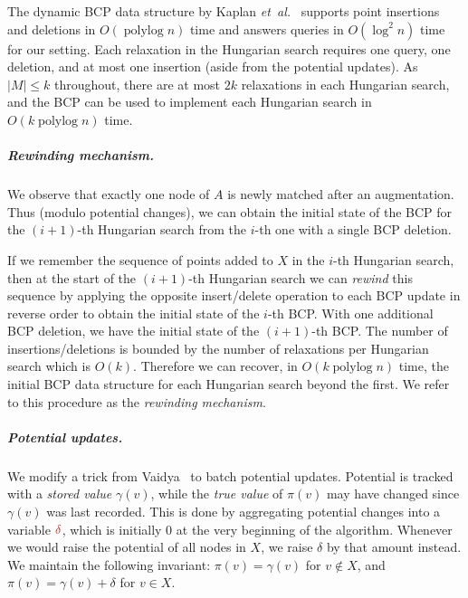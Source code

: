 \documentclass[a4paper,UKenglish,nolineno]{socg-lipics-v2019}
\makeatletter
\def\etal{\emph{et~al.}}
\def\etal{\textit{et~al.}}
\def\polylog{\mathop{\mathrm{polylog}}}
\def\abs#1{\mathopen| #1 \mathclose|}		%
\def\EMPH#1{\textcolor{BrickRed}{{\emph{#1}}}}
\def\n@te#1{\textsf{\boldmath \textbf{$\langle\!\langle$#1$\rangle\!\rangle$}}\leavevmode}
\def\note#1{\textcolor{red}{\n@te{#1}}}
\makeatother
\begin{document}
The dynamic BCP data structure by Kaplan \etal~\cite{KMRSS17} supports point insertions and deletions in
$O(\polylog n)$ time and answers queries in $O(\log^2 n)$ time for our setting.
Each relaxation in the Hungarian search requires
one query, one deletion, and at most one insertion (aside from the potential updates).
As $\abs{M} \leq k$ throughout, there are at most $2k$ relaxations in each
Hungarian search, and the BCP can be used to implement each Hungarian search
in $O(k\polylog n)$ time.

\subparagraph{Rewinding mechanism.}
We observe that exactly one node of $A$ is newly matched after an augmentation.
Thus (modulo potential changes), we can obtain the initial state of the BCP for
the $(i+1)$-th Hungarian search from the $i$-th one with a single BCP deletion.

If we remember the sequence of points added to $X$ in the $i$-th Hungarian search,
then at the start of the $(i+1)$-th Hungarian search we can \emph{rewind} this
sequence by applying the opposite insert/delete operation to each BCP update
in reverse order to obtain the initial state of the $i$-th BCP.
With one additional BCP deletion, we have the initial state of the $(i+1)$-th BCP.
The number of insertions/deletions is bounded by the number of
relaxations per Hungarian search which is $O(k)$.
Therefore we can recover, in $O(k\polylog n)$
time, the initial BCP data structure for each Hungarian search beyond the first.
We refer to this procedure as the \EMPH{rewinding mechanism}.


\subparagraph{Potential updates.}
We modify a trick from Vaidya~\cite{Vaidya89} to batch potential updates.
Potential is tracked with a \EMPH{stored value} $\gamma(v)$, while the
\EMPH{true value} of $\pi(v)$ may have changed since $\gamma(v)$ was last recorded.
This is done by aggregating potential changes into a variable $\EMPH{$\delta$}$,
which is initially 0 at the very beginning of the algorithm.
Whenever we would raise the potential of all nodes in $X$, we raise
$\delta$ by that amount instead.
We maintain the following invariant: $\pi(v) = \gamma(v)$ for $v \not\in X$,
and $\pi(v) = \gamma(v) + \delta$ for $v \in X$.
\end{document}
